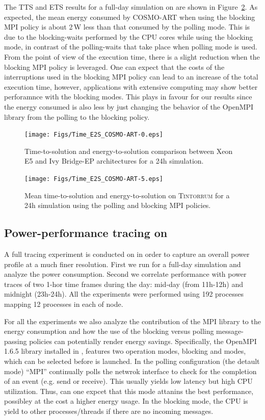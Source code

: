 The TTS and ETS results for a full-day simulation on \tinto are shown in Figure~\ref{fig:4}.  As expected, the mean energy consumed by COSMO-ART when using the blocking MPI policy is about 2\,W less than that consumed by the polling mode. This is due to the blocking-waits performed by the CPU cores while using the blocking mode, in contrast of the polling-waits that take place when polling mode is used. From the point of view of the execution time, there is a slight reduction when the blocking MPI policy is leveraged. One can expect that the costs of the interruptions used in the blocking MPI policy can lead to an increase of the total execution time, however, applications with extensive computing may show better perforamnce with the blocking modes. This plays in favour for our results since the energy consumed is also less by just changing the behavior of the OpenMPI library from the polling to the blocking policy.



\begin{figure}[htbf]
  \texttt{[image: Figs/Time\_E2S\_COSMO-ART-0.eps]}
  \caption{Time-to-solution and energy-to-solution comparison between
    Xeon E5 and Ivy Bridge-EP architectures for a 24h simulation.}
  \label{fig:3}
\end{figure}

\begin{figure}[htbf]
  \texttt{[image: Figs/Time\_E2S\_COSMO-ART-5.eps]}
  \caption{Mean time-to-solution and energy-to-solution on
    \textsc{Tintorrum} for a 24h simulation using the polling and blocking MPI policies.}
  \label{fig:4}
\end{figure}

\subsection{Power-performance tracing on \tinto}
\label{subsec:4.3}

A full tracing experiment is conducted on \tinto in order to capture an overall power
profile at a much finer resolution. First we run \cosmoart for a full-day simulation
and analyze the power consumption. Second we correlate performance with
power traces of two 1-hor time frames during the day: mid-day (from 11h-12h) and
midnight (23h-24h). All the experiments were performed using 192 \cosmoart processes
mapping 12 processes in each of node.

For all the experiments we also analyze the contribution of the MPI library to the energy 
consumption and how the use of the blocking versus polling message-passing policies can 
potentially render energy savings. Specifically, the OpenMPI 1.6.5 library installed in \tinto, 
features two operation modes, blocking and modes, which can be selected before \cosmoart is 
launched. In the polling configuration (the detault mode) ``MPI'' continually polls
the netwrok interface to check for the completion of an event (e.g. send or receive).
This usually yields low latency but high CPU utilization. Thus, can one expcet that this mode attanins the best performance, possibley at the cost a higher energy usage. In the blocking
mode, the CPU is yield to other processes/threads if there are no incoming messages.

